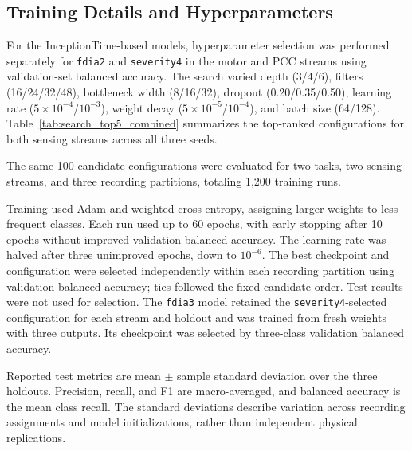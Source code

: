 \documentclass[letterpaper,journal]{IEEEtran}
\begin{document}
\subsection{Training Details and Hyperparameters}
\label{sec:training_details}

For the InceptionTime-based models, hyperparameter selection was performed separately for \texttt{fdia2} and \texttt{severity4} in the motor and PCC streams using validation-set balanced accuracy. The search varied depth (3/4/6), filters (16/24/32/48), bottleneck width (8/16/32), dropout (0.20/0.35/0.50), learning rate ($5\times10^{-4}$/$10^{-3}$), weight decay ($5\times10^{-5}$/$10^{-4}$), and batch size (64/128). Table~\ref{tab:search_top5_combined} summarizes the top-ranked configurations for both sensing streams across all three seeds.

The same 100 candidate configurations were evaluated for two tasks, two sensing streams, and three recording partitions, totaling 1,200 training runs.

Training used Adam and weighted cross-entropy, assigning larger weights to less frequent classes. Each run used up to 60 epochs, with early stopping after 10 epochs without improved validation balanced accuracy. The learning rate was halved after three unimproved epochs, down to $10^{-6}$. The best checkpoint and configuration were selected independently within each recording partition using validation balanced accuracy; ties followed the fixed candidate order. Test results were not used for selection. The \texttt{fdia3} model retained the \texttt{severity4}-selected configuration for each stream and holdout and was trained from fresh weights with three outputs. Its checkpoint was selected by three-class validation balanced accuracy.

Reported test metrics are mean $\pm$ sample standard deviation over the three holdouts. Precision, recall, and F1 are macro-averaged, and balanced accuracy is the mean class recall. The standard deviations describe variation across recording assignments and model initializations, rather than independent physical replications.
\end{document}
